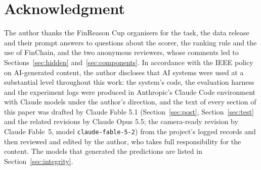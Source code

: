 \documentclass[conference]{IEEEtran}
\newcommand{\id}[1]{\texttt{#1}}
\begin{document}
\section*{Acknowledgment}
The author thanks the FinReason Cup organisers for the task, the data release and their prompt answers to questions about the scorer, the ranking rule and the use of FinChain, and the two anonymous reviewers, whose comments led to Sections~\ref{sec:hidden} and~\ref{sec:components}. In accordance with the IEEE policy on AI-generated content, the author discloses that AI systems were used at a substantial level throughout this work: the system's code, the evaluation harness and the experiment logs were produced in Anthropic's Claude Code environment with Claude models under the author's direction, and the text of every section of this paper was drafted by Claude Fable 5.1 (Section~\ref{sec:post}, Section~\ref{sec:test} and the related revisions by Claude Opus 5.5; the camera-ready revision by Claude Fable~5, model \id{claude-fable-5-2}) from the project's logged records and then reviewed and edited by the author, who takes full responsibility for the content. The models that generated the predictions are listed in Section~\ref{sec:integrity}.



\end{document}
